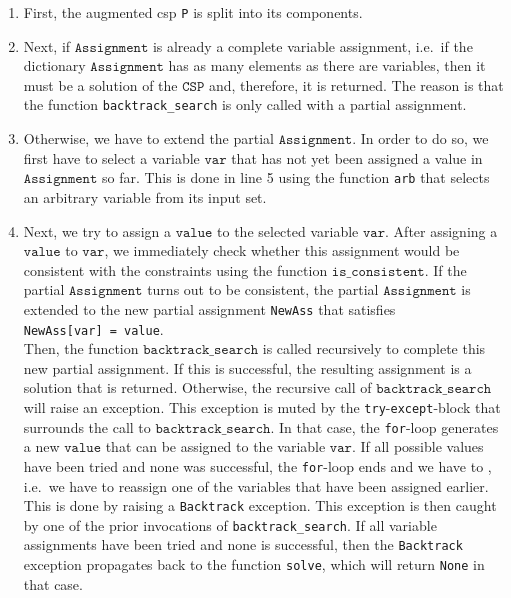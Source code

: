 \begin{enumerate}
\item First, the augmented \ac{csp} \texttt{P} is split into its components.
\item Next, if $\texttt{Assignment}$ is already a complete variable assignment, i.e.~if the dictionary
      $\texttt{Assignment}$ has as many elements as there are variables, then it must be a solution of
      the $\texttt{CSP}$ and, therefore, it is returned.  The reason is that the function
      \texttt{backtrack\_search} is only called with a  partial assignment.
\item Otherwise, we have to extend the partial $\texttt{Assignment}$.  In order to do so, we first have to
      select a variable $\texttt{var}$ that has not yet been assigned a value in $\texttt{Assignment}$ so far.
      This is done in line 5 using the function \texttt{arb} that selects an arbitrary variable
      from its input set.  
\item Next, we try to assign a $\texttt{value}$ to the selected variable $\texttt{var}$.  After assigning
      a $\texttt{value}$ to $\texttt{var}$, we immediately check whether this assignment would be consistent
      with the constraints using the function $\texttt{is\_consistent}$.
      If the partial $\texttt{Assignment}$ turns out to be consistent, the partial $\texttt{Assignment}$
      is extended to the new partial assignment \texttt{NewAss} that satisfies
      \\[0.2cm]
      \hspace*{1.3cm}
      \texttt{NewAss[var] = value}.
      \\[0.2cm]
      Then, the function $\texttt{backtrack\_search}$ is called recursively to complete this new partial assignment.
      If this is successful, the resulting assignment is a solution that is returned.  Otherwise,
      the recursive call of $\texttt{backtrack\_search}$ will raise an exception.  This exception is muted 
      by the \texttt{try}-\texttt{except}-block that surrounds the call to $\texttt{backtrack\_search}$.  In that case, the
      \texttt{for}-loop generates a new $\texttt{value}$ that can be assigned to the variable
      $\texttt{var}$.  If all possible values have been tried and none was successful, the \texttt{for}-loop
      ends and we have to , i.e.~we have to reassign one of the variables that have been
      assigned earlier.  This is done by raising a \texttt{Backtrack} exception.  This exception is then caught
      by one of the prior invocations of \texttt{backtrack\_search}.  If all variable assignments have been
      tried and none is successful, then the \texttt{Backtrack} exception propagates back to the function
      \texttt{solve}, which will return \texttt{None} in that case.
\end{enumerate}



